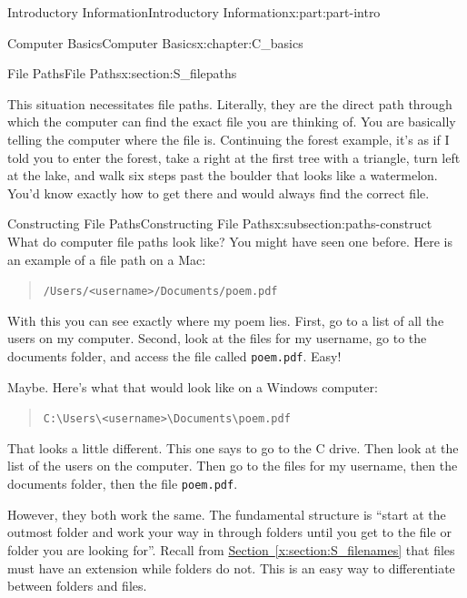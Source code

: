 \documentclass[oneside,10pt,]{book}
\newcommand{\xreffont}{\relax}
\newcommand{\mono}[1]{\texttt{#1}}
\begin{document}
\begin{partptx}{Introductory Information}{}{Introductory Information}{}{}{x:part:part-intro}
\begin{chapterptx}{Computer Basics}{}{Computer Basics}{}{}{x:chapter:C_basics}
\begin{sectionptx}{File Paths}{}{File Paths}{}{}{x:section:S_filepaths}
\begin{introduction}{}
\par
This situation necessitates file paths. Literally, they are the direct path through which the computer can find the exact file you are thinking of. You are basically telling the computer where the file is. Continuing the forest example, it's as if I told you to enter the forest, take a right at the first tree with a triangle, turn left at the lake, and walk six steps past the boulder that looks like a watermelon. You'd know exactly how to get there and would always find the correct file.%
\end{introduction}%
%
%
\typeout{************************************************}
\typeout{************************************************}
%
\begin{subsectionptx}{Constructing File Paths}{}{Constructing File Paths}{}{}{x:subsection:paths-construct}
%
%
%
What do computer file paths look like? You might have seen one before. Here is an example of a file path on a Mac: \begin{quote}%
\mono{/Users/<username>/Documents/poem.pdf}\end{quote}
 With this you can see exactly where my poem lies. First, go to a list of all the users on my computer. Second, look at the files for my username, go to the documents folder, and access the file called \mono{poem.pdf}. Easy!%
\par
Maybe. Here's what that would look like on a Windows computer: \begin{quote}%
\mono{C:\textbackslash{}Users\textbackslash{}<username>\textbackslash{}Documents\textbackslash{}poem.pdf}\end{quote}
 That looks a little different. This one says to go to the C drive. Then look at the list of the users on the computer. Then go to the files for my username, then the documents folder, then the file \mono{poem.pdf}.%
\par
However, they both work the same. The fundamental structure is ``start at the outmost folder and work your way in through folders until you get to the file or folder you are looking for''. Recall from \hyperref[x:section:S_filenames]{Section~{\xreffont\ref{x:section:S_filenames}}} that files must have an extension while folders do not. This is an easy way to differentiate between folders and files.%
\par

\end{subsectionptx}
\end{sectionptx}
\end{chapterptx}
\end{partptx}
\end{document}

